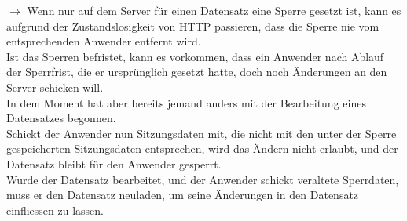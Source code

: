 \noindent
$\rightarrow$ Wenn nur auf dem Server für einen Datensatz eine Sperre gesetzt ist, kann es aufgrund der Zustandslosigkeit von HTTP passieren, dass die Sperre nie vom entsprechenden Anwender entfernt wird.\\
Ist das Sperren befristet, kann es vorkommen, dass ein Anwender nach Ablauf der Sperrfrist, die er ursprünglich gesetzt hatte, doch noch Änderungen an den Server schicken will.\\
In dem Moment hat aber bereits jemand anders mit der Bearbeitung eines Datensatzes begonnen.\\
Schickt der Anwender nun Sitzungsdaten mit, die nicht mit den unter der Sperre gespeicherten Sitzungsdaten entsprechen, wird das Ändern nicht erlaubt, und der Datensatz bleibt für den Anwender gesperrt.\\
Wurde der Datensatz bearbeitet, und der Anwender schickt veraltete Sperrdaten, muss er den Datensatz neuladen, um seine Änderungen in den Datensatz einfliessen zu lassen.